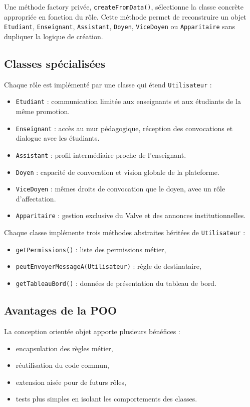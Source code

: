 \documentclass[12pt,a4paper]{article}
\begin{document}
Une méthode factory privée, \texttt{createFromData()}, sélectionne la classe concrète appropriée en fonction du rôle. Cette méthode permet de reconstruire un objet \texttt{Etudiant}, \texttt{Enseignant}, \texttt{Assistant}, \texttt{Doyen}, \texttt{ViceDoyen} ou \texttt{Apparitaire} sans dupliquer la logique de création.

\subsection{Classes spécialisées}
Chaque rôle est implémenté par une classe qui étend \texttt{Utilisateur} :
\begin{itemize}
  \item \texttt{Etudiant} : communication limitée aux enseignants et aux étudiants de la même promotion.
  \item \texttt{Enseignant} : accès au mur pédagogique, réception des convocations et dialogue avec les étudiants.
  \item \texttt{Assistant} : profil intermédiaire proche de l'enseignant.
  \item \texttt{Doyen} : capacité de convocation et vision globale de la plateforme.
  \item \texttt{ViceDoyen} : mêmes droits de convocation que le doyen, avec un rôle d'affectation.
  \item \texttt{Apparitaire} : gestion exclusive du Valve et des annonces institutionnelles.
\end{itemize}

Chaque classe implémente trois méthodes abstraites héritées de \texttt{Utilisateur} :
\begin{itemize}
  \item \texttt{getPermissions()} : liste des permissions métier,
  \item \texttt{peutEnvoyerMessageA(Utilisateur)} : règle de destinataire,
  \item \texttt{getTableauBord()} : données de présentation du tableau de bord.
\end{itemize}

\subsection{Avantages de la POO}
La conception orientée objet apporte plusieurs bénéfices :
\begin{itemize}
  \item encapsulation des règles métier,
  \item réutilisation du code commun,
  \item extension aisée pour de futurs rôles,
  \item tests plus simples en isolant les comportements des classes.
\end{itemize}
\end{document}
